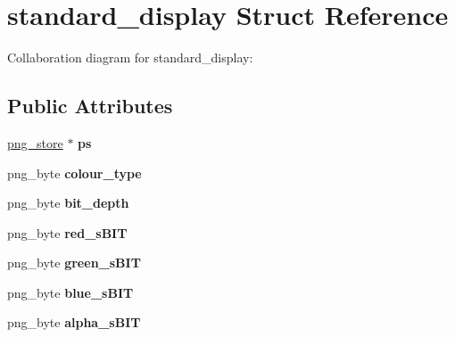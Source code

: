 \hypertarget{structstandard__display}{\section{standard\+\_\+display Struct Reference}
\label{structstandard__display}
}


Collaboration diagram for standard\+\_\+display\+:
\subsection*{Public Attributes}
\begin{DoxyCompactItemize}
\item 
\hypertarget{structstandard__display_a0c361869cc689136d434258cf2fb8f5c}{\hyperlink{structpng__store}{png\+\_\+store} $\ast$ {\bfseries ps}}\label{structstandard__display_a0c361869cc689136d434258cf2fb8f5c}

\item 
\hypertarget{structstandard__display_a752252326825dc83a3c7049b6e4f064a}{png\+\_\+byte {\bfseries colour\+\_\+type}}\label{structstandard__display_a752252326825dc83a3c7049b6e4f064a}

\item 
\hypertarget{structstandard__display_ab37fe9410848c295825a04164822fc95}{png\+\_\+byte {\bfseries bit\+\_\+depth}}\label{structstandard__display_ab37fe9410848c295825a04164822fc95}

\item 
\hypertarget{structstandard__display_a430df5899d9eef964bf7ad2d9176c089}{png\+\_\+byte {\bfseries red\+\_\+s\+B\+I\+T}}\label{structstandard__display_a430df5899d9eef964bf7ad2d9176c089}

\item 
\hypertarget{structstandard__display_ad090253da60bcc5e91511c4dfc1c87f3}{png\+\_\+byte {\bfseries green\+\_\+s\+B\+I\+T}}\label{structstandard__display_ad090253da60bcc5e91511c4dfc1c87f3}

\item 
\hypertarget{structstandard__display_a5aafd7ef550b97daaf90276df8bc46ef}{png\+\_\+byte {\bfseries blue\+\_\+s\+B\+I\+T}}\label{structstandard__display_a5aafd7ef550b97daaf90276df8bc46ef}

\item 
\hypertarget{structstandard__display_a7efae38fb2c6162e5afdb7b6c87c0524}{png\+\_\+byte {\bfseries alpha\+\_\+s\+B\+I\+T}}\label{structstandard__display_a7efae38fb2c6162e5afdb7b6c87c0524}


\end{DoxyCompactItemize}
